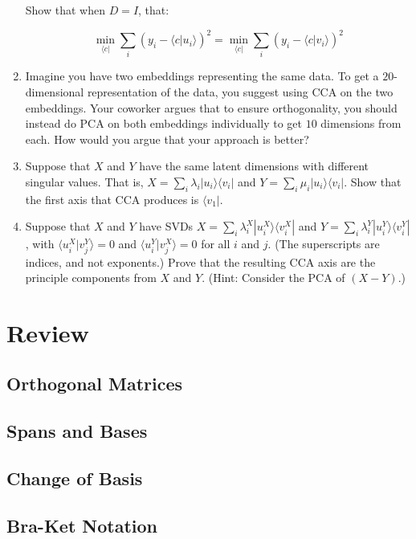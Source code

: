 \documentclass{amsbook}
\begin{document}
\begin{enumerate}
\noindent Show that when $D=I$, that:

$$
\min_{\langle c|}\sum_i \left(y_i-\langle c|u_{i}\rangle\right)^2 = \min_{\langle c|}\sum_i \left(y_i-\langle c|v_{i}\rangle\right)^2
$$
\item Imagine you have two embeddings representing the same data.  To get a $20$-dimensional representation of the data, you suggest using CCA on the two embeddings.  Your coworker argues that to ensure orthogonality, you should instead do PCA on both embeddings individually to get $10$ dimensions from each.  How would you argue that your approach is better?
\item Suppose that $X$ and $Y$ have the same latent dimensions with different singular values.  That is, $X=\sum_i\lambda_i|u_i\rangle\langle v_i|$ and $Y=\sum_i\mu_i|u_i\rangle\langle v_i|$.  Show that the first axis that CCA produces is $\langle v_1|$.
\item Suppose that $X$ and $Y$ have SVDs $X=\sum_i\lambda_i^X|u_i^X\rangle\langle v_i^X|$ and $Y=\sum_i\lambda_i^Y|u_i^Y\rangle\langle v_i^Y|$, with $\langle u_i^X|v_j^Y\rangle=0$ and $\langle u_i^Y|v_j^X\rangle=0$ for all $i$ and $j$.  (The superscripts are indices, and not exponents.)  Prove that the resulting CCA axis are the principle components from $X$ and $Y$.  (Hint: Consider the PCA of $(X-Y)$.)
\end{enumerate}

\chapter{Review}

\section{Orthogonal Matrices}
\section{Spans and Bases}\label{Spans and Bases}
\section{Change of Basis}\label{Change of Basis}
\section{Bra-Ket Notation}\label{Bra-Ket Notation}
\end{document}
